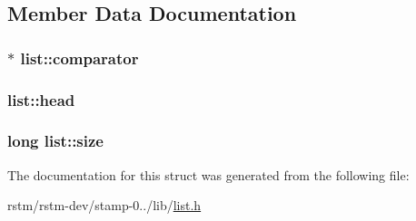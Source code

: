 \subsection{Member Data Documentation}
\hypertarget{structlist_abd348acf9d415c64cf4b2019faaabeee}{
\subsubsection[{comparator}]{$\ast$ list\-::comparator}}\label{structlist_abd348acf9d415c64cf4b2019faaabeee}
\hypertarget{structlist_a52675340671a2030d93dfcdc94bbc815}{
\subsubsection[{head}]{ list\-::head}}\label{structlist_a52675340671a2030d93dfcdc94bbc815}
\hypertarget{structlist_aa08db5b0d9b53779bda7164fc8488a56}{
\subsubsection[{size}]{\setlength{\rightskip}{0pt plus 5cm}long list\-::size}}\label{structlist_aa08db5b0d9b53779bda7164fc8488a56}


The documentation for this struct was generated from the following file\-:\begin{DoxyCompactItemize}
\item 
rstm/rstm-\/dev/stamp-\/0../lib/\hyperlink{list_8h}{list.\-h}\end{DoxyCompactItemize}
